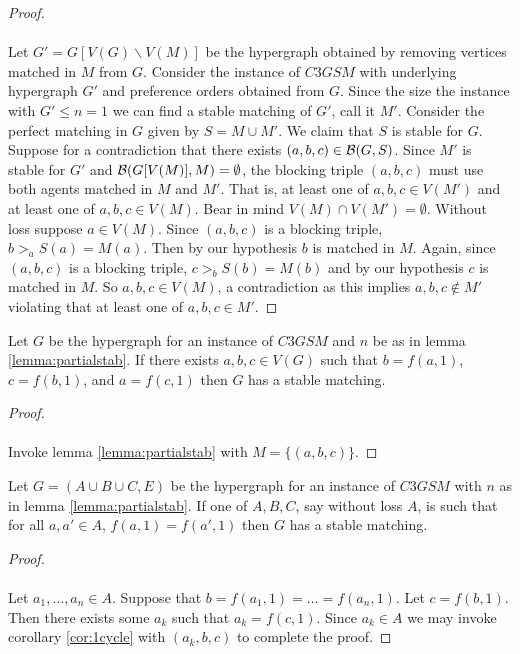 \begin{proof}
\paragraph{}
Let $G' = G[V(G)\backslash V(M)]$ be the hypergraph obtained by removing vertices matched in $M$ from $G$. Consider the instance of $C3GSM$ with underlying hypergraph $G'$ and preference orders obtained from $G$. Since the size the instance with $G' \leq n=1$ we can find a stable matching of $G'$, call it $M'$. Consider the perfect matching in $G$ given by $S = M \cup M'$. We claim that $S$ is stable for $G$. Suppose for a contradiction that there exists $(a,b,c) \in \mathcal{B}(G, S)$. Since $M'$ is stable for $G'$ and $\mathcal{B}(G[V(M)], M) = \emptyset$, the blocking triple $(a,b,c)$ must use both agents matched in $M$ and $M'$. That is, at least one of $a,b,c \in V(M')$ and at least one of $a,b,c \in V(M)$. Bear in mind $V(M) \cap V(M') = \emptyset$. Without loss suppose $a \in V(M)$. Since $(a,b,c)$ is a blocking triple, $b >_a S(a) = M(a)$. Then by our hypothesis $b$ is matched in $M$. Again, since $(a,b,c)$ is a blocking triple, $c >_b S(b) = M(b)$ and by our hypothesis $c$ is matched in $M$. So $a,b,c \in V(M)$, a contradiction as this implies $a,b,c \not\in M'$ violating that at least one of $a,b,c \in M'$.
\end{proof}
\begin{corollary}\label{cor:1cycle}
Let $G$ be the hypergraph for an instance of $C3GSM$ and $n$ be as in lemma \ref{lemma:partialstab}. If there exists $a,b,c \in V(G)$ such that $b = f(a,1)$, $c = f(b,1)$, and $a = f(c,1)$ then $G$ has a stable matching.
\end{corollary}
\begin{proof}
\paragraph{}
Invoke lemma \ref{lemma:partialstab} with $M = \{(a,b,c)\}$.
\end{proof}
\begin{corollary}
Let $G=(A\cup B \cup C, E)$ be the hypergraph for an instance of $C3GSM$ with $n$ as in lemma \ref{lemma:partialstab}. If one of $A,B,C$, say without loss $A$, is such that for all $a,a' \in A$, $f(a,1) = f(a',1)$ then $G$ has a stable matching.
\end{corollary}
\begin{proof}
\paragraph{}
Let $a_1, \dots, a_n \in A$. Suppose that $b = f(a_1,1) =  \dots = f(a_n,1)$. Let $c = f(b,1)$. Then there exists some $a_k$ such that $a_k = f(c,1)$. Since $a_k \in A$ we may invoke corollary \ref{cor:1cycle} with $(a_k, b, c)$ to complete the proof.
\end{proof}
